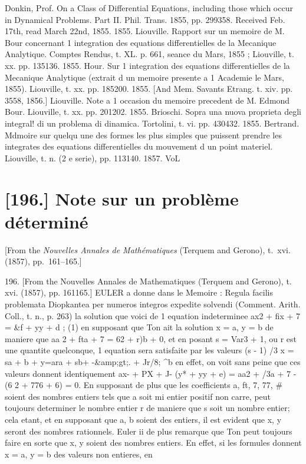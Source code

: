 \documentclass[11pt,a4paper]{book}
\begin{document}
Donkin, Prof.
On
a
Class
of
Differential
Equations,
including
those
which
occur
in
Dynamical Problems.
Part
II.
Phil. Trans. 1855, pp. 299358.
Received
Feb. 17th,
read March
22nd, 1855.
1855.
Liouville.
Rapport
sur un
memoire
de
M. Bour
concernant
1 integration des equations
differentielles
de
la Mecanique
Analytique.
Comptes
Rendus,
t.
XL.
p.
661, seance
du
Mars, 1855
;
Liouville,
t.
xx.
pp. 135136.
1855.
Hour.
Sur
1 integration
des
equations
differentielles
de
la
Mecanique
Analytique
(extrait
d un
memoire
presente
a
1 Academie
le
Mars,
1855).
Liouville,
t.
xx.
pp. 185200.
1855.
[And Mem. Savants Etrang.
t.
xiv.
pp. 3558,
1856.]
Liouville.
Note
a
1 occasion
du
memoire
precedent
de
M.
Edmond
Bour.
Liouville,
t.
xx.
pp. 201202.
1855.
Brioschi.
Sopra
una
nuova
proprieta
degli
integral!
di
un
problema
di
dinamica.
Tortolini,
t.
vi.
pp. 430432.
1855.
Bertrand.
Mdmoire
sur
quelqu une
des
formes
les
plus
simples
que
puissent prendre
les
integrates
des
equations
differentielles
du
mouvement
d un
point
materiel.
Liouville,
t.
n.
(2
e
serie),
pp. 113140.
1857.
VoL

\newpage

\section*{[196.] Note sur un probl\`eme d\'etermin\'e}
\begin{center}
[From the \textit{Nouvelles Annales de Math\'ematiques} (Terquem and Gerono), t.~xvi. (1857), pp.~161--165.]
\end{center}


196.
[From
the
Nouvelles
Annales
de
Mathematiques
(Terquem and
Gerono),
t.
xvi.
(1857),
pp. 161165.]
EULER a donne dans
le Memoire
:
Regula facilis problemata Diopkantea per numeros
integros
expedite
solvendi
(Comment.
Arith.
Coll.,
t.
n.,
p.
263)
la solution
que
voici
de
1 equation indeterminee
ax2 + fix + 7 = \&f + yy + d
;
(1)
en supposant que Ton
ait
la solution x = a, y = b de maniere que
aa
2 + fta + 7 =
62 + r)b + 0,
et en posant
s = Var3 + 1,
ou r
est une quantite quelconque,
1 equation sera
satisfaite par
les valeurs
(s - 1) /3
x = sa +
b +
y=ara + sb+
-\&amp;gt;.
+ Jr/8;
^b
en
effet, on
voit sans peine que
ces
valeurs donnent identiquement
ax- + PX + J- (y* + yy + e) = aa2 + /3a + 7 - (6
2 + 776 + 6) = 0.
En supposant
de
plus que
les
coefficients
a,
ft,
7,
77, \# soient des nombres
entiers
tels
que
a
soit
mi
entier
positif
non
carre,
peut
toujours
determiner
le
nombre
entier
r
de
maniere
que
s
soit
un
nombre
entier;
cela
etant,
et
en
supposant
que
a,
b
soient
des
entiers,
il
est
evident
que
x, y
seront
des
nombres
rationnels.
Euler
ii
de
plus
remarque
que
Ton
peut
toujours
faire
en
sorte que
x, y soient des nombres
entiers.
En
effet,
si
les
formules
donnent
x = a, y = b
des
valeurs
non
entieres,
en
\end{document}
